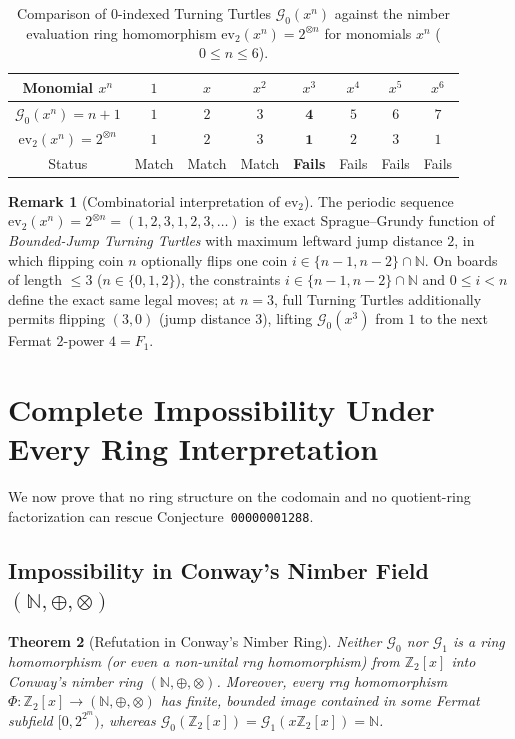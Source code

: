\documentclass[11pt,a4paper]{article}
\newtheorem{theorem}{Theorem}[section]
\theoremstyle{definition}
\newtheorem{remark}[theorem]{Remark}
\newcommand{\Z}{\mathbb{Z}}
\newcommand{\N}{\mathbb{N}}
\newcommand{\SG}{\mathcal{G}}
\newcommand{\ev}{\mathrm{ev}}
\begin{document}
\begin{table}[ht]
\centering
\caption{Comparison of $0$-indexed Turning Turtles $\SG_0(x^n)$ against the nimber
evaluation ring homomorphism $\ev_2(x^n) = 2^{\otimes n}$ for monomials $x^n$ ($0 \le n \le 6$).}
\label{tab:coincidence}
\medskip
\begin{tabular}{cccccccc}
\hline
Monomial $x^n$ & $1$ & $x$ & $x^2$ & $x^3$ & $x^4$ & $x^5$ & $x^6$ \\
\hline
$\SG_0(x^n) = n + 1$ & $1$ & $2$ & $3$ & $\mathbf{4}$ & $5$ & $6$ & $7$ \\
$\ev_2(x^n) = 2^{\otimes n}$ & $1$ & $2$ & $3$ & $\mathbf{1}$ & $2$ & $3$ & $1$ \\
Status & Match & Match & Match & \textbf{Fails} & Fails & Fails & Fails \\
\hline
\end{tabular}
\end{table}

\begin{remark}[Combinatorial interpretation of $\ev_2$]
The periodic sequence $\ev_2(x^n) = 2^{\otimes n} = (1,2,3,1,2,3,\dots)$ is the exact
Sprague--Grundy function of \emph{Bounded-Jump Turning Turtles} with maximum leftward jump
distance $2$, in which flipping coin $n$ optionally flips one coin $i \in \{n-1,n-2\}\cap\N$.
On boards of length $\le 3$ ($n \in \{0,1,2\}$), the constraints $i \in \{n-1,n-2\}\cap\N$
and $0 \le i < n$ define the exact same legal moves; at $n = 3$, full Turning Turtles
additionally permits flipping $(3,0)$ (jump distance $3$), lifting $\SG_0(x^3)$ from $1$
to the next Fermat $2$-power $4 = F_1$.
\end{remark}

\section{Complete Impossibility Under Every Ring Interpretation}

We now prove that no ring structure on the codomain and no quotient-ring factorization can
rescue Conjecture~\texttt{00000001288}.

\subsection{Impossibility in Conway's Nimber Field $(\N,\oplus,\otimes)$}

\begin{theorem}[Refutation in Conway's Nimber Ring]
\label{thm:nimber-no}
Neither $\SG_0$ nor $\SG_1$ is a ring homomorphism (or even a non-unital rng homomorphism)
from $\Z_2[x]$ into Conway's nimber ring $(\N,\oplus,\otimes)$. Moreover, \emph{every}
rng homomorphism $\Phi : \Z_2[x] \to (\N,\oplus,\otimes)$ has finite, bounded image
contained in some Fermat subfield $[0,2^{2^m})$, whereas $\SG_0(\Z_2[x]) = \SG_1(x\Z_2[x]) = \N$.
\end{theorem}
\end{document}
